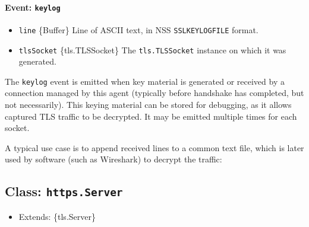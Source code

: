 \paragraph{\texorpdfstring{Event:
\texttt{\textquotesingle{}keylog\textquotesingle{}}}{Event: \textquotesingle keylog\textquotesingle{}}}\label{event-keylog}

\begin{itemize}
\tightlist
\item
  \texttt{line} \{Buffer\} Line of ASCII text, in NSS
  \texttt{SSLKEYLOGFILE} format.
\item
  \texttt{tlsSocket} \{tls.TLSSocket\} The \texttt{tls.TLSSocket}
  instance on which it was generated.
\end{itemize}

The \texttt{keylog} event is emitted when key material is generated or
received by a connection managed by this agent (typically before
handshake has completed, but not necessarily). This keying material can
be stored for debugging, as it allows captured TLS traffic to be
decrypted. It may be emitted multiple times for each socket.

A typical use case is to append received lines to a common text file,
which is later used by software (such as Wireshark) to decrypt the
traffic:

\begin{Shaded}
\begin{Highlighting}[]
\NormalTok{(}\OperatorTok{,}\OperatorTok{,}\KeywordTok{=\textgreater{}}\NormalTok{ \{}
\NormalTok{(}\OperatorTok{,}\OperatorTok{,}\NormalTok{ \{ }\OperatorTok{:} \NormalTok{ \})}\OperatorTok{;}
\NormalTok{\})}\OperatorTok{;}
\end{Highlighting}
\end{Shaded}

\subsection{\texorpdfstring{Class:
\texttt{https.Server}}{Class: https.Server}}\label{class-https.server}

\begin{itemize}
\tightlist
\item
  Extends: \{tls.Server\}
\end{itemize}

